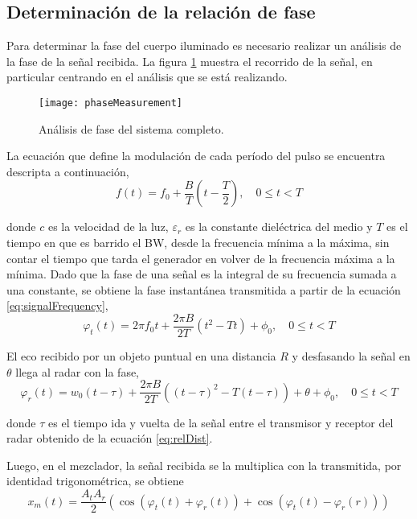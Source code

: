 \subsection{Determinación de la relación de fase}

Para determinar la fase del cuerpo iluminado es necesario realizar un análisis de la fase de la señal recibida. La figura \ref{fig:phaseSystem} muestra el recorrido de la señal, en particular centrando en el análisis que se está realizando.
\begin{figure}[htb]
 \centering
 \texttt{[image: phaseMeasurement]}
 \caption{Análisis de fase del sistema completo.}
 \label{fig:phaseSystem}
\end{figure}

La ecuación que define la modulación de cada período del pulso se encuentra descripta a continuación,
\begin{equation}
  f(t) = f_0 + \dfrac{B}{T}(t-\dfrac{T}{2}),\quad 0 \le t < T
  \label{eq:signalFrequency}
\end{equation}

donde $c$ es la velocidad de la luz, $\varepsilon_r$ es la constante dieléctrica del medio \cite{Brennan2014a} y $T$ es el tiempo en que es barrido el BW, desde la frecuencia mínima a la máxima, sin contar el tiempo que tarda el generador en volver de la frecuencia máxima a la mínima. Dado que la fase de una señal es la integral de su frecuencia sumada a una constante, se obtiene la fase instantánea transmitida a partir de la ecuación \ref{eq:signalFrequency},
\begin{equation}
  \varphi_t(t) = 2\pi f_0t + \dfrac{2\pi B}{2T}(t^2-Tt) + \phi_0,\quad 0 \le t < T
  \label{eq:signalFrequency2}
\end{equation}

El eco recibido por un objeto puntual en una distancia $R$ y desfasando la señal en $\theta$ llega al radar con la fase,
\begin{equation}
  \varphi_r(t) = w_0(t-\tau) + \dfrac{2\pi B}{2T}((t - \tau)^2-T(t - \tau)) + \theta + \phi_0,\quad 0 \le t < T
  \label{eq:signalFrequency3}
\end{equation}

donde $\tau$ es el tiempo ida y vuelta de la señal entre el transmisor y receptor del radar obtenido de la ecuación \ref{eq:relDist}.

Luego, en el mezclador, la señal recibida se la multiplica con la transmitida, por identidad trigonométrica, se obtiene
\begin{equation}
  x_m(t) = \dfrac{A_tA_r}{2}(\cos(\varphi_t(t)+\varphi_r(t)) + \cos(\varphi_t(t)- \varphi_r(r)))
  \label{eq:signalFrequency4}
\end{equation}

